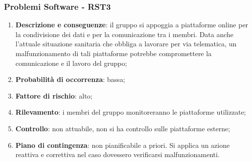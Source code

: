 	\subsubsection{Problemi Software - RST3}
	\begin{enumerate}
		\item \textbf{Descrizione e conseguenze}: il gruppo si appoggia a piattaforme online per la condivisione dei dati e per la comunicazione tra i membri. Data anche l'attuale situazione sanitaria che obbliga a lavorare per via telematica, un malfunzionamento di tali piattaforme potrebbe compromettere la comunicazione e il lavoro del gruppo;
		\item \textbf{Probabilità di occorrenza}: bassa;
		\item \textbf{Fattore di rischio}: alto;
		\item \textbf{Rilevamento}: i membri del gruppo monitoreranno le piattaforme utilizzate;
		\item \textbf{Controllo}: non attuabile, non si ha controllo sulle piattaforme esterne; 
		\item \textbf{Piano di contingenza}: non pianificabile a priori. Si applica un azione reattiva e correttiva nel caso dovessero verificarsi malfunzionamenti.
	\end{enumerate}		
